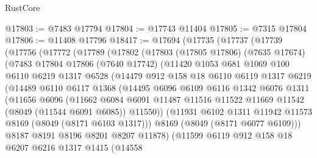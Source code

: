 \begin{lexlean}{RustCore}
\begin{coremodule}
@17803 := @7483 @17794
@17804 := @17743 @11404
@17805 := @7315 @17804
@17806 := @11408 @17796
@18417 := @17694
    (@17735
      (@17737
        (@17739
          (@17756
            (@17772
              (@17789
                (@17802
                  (@17803
                    (@17805 @17806)
                    (@7635 @17674)
                    (@7483
                      @17804
                      @17806
                      (@7640 @17742)
                      (@11420
                        @1053
                        @681
                        @1069
                        @100
                        @6110
                        @6219
                        @1317
                        @6528
                        (@14479
                          @912
                          @158
                          @18
                          @6110
                          @6119
                          @1317
                          @6219
                          (@14489
                            @6110
                            @6117
                            @1368
                            (@14495
                              @6096
                              @6109
                              @6116
                              @1342
                              @6076
                              @1311
                              (@11656
                                @6096
                                (@11662
                                  @6084
                                  @6091
                                  @11487
                                  @11516
                                  @11522
                                  @11669
                                  @11542
                                  (@8049 (@11544 @6091 @6085))
                                  @11550))
                              (@11931 @6102 @1311 @11942 @11573 @8169 (@8049 (@8171 @6103 @1317)))
                              @8169
                              (@8049 (@8171 @6077 @6109)))
                            @8187
                            @8191
                            @8196
                            @8201
                            @8207
                            @11878)
                          (@11599
                            @6119
                            @912
                            @158
                            @18
                            @6207
                            @6216
                            @1317
                            @1415
                            (@14558

\end{coremodule}
\end{lexlean}
